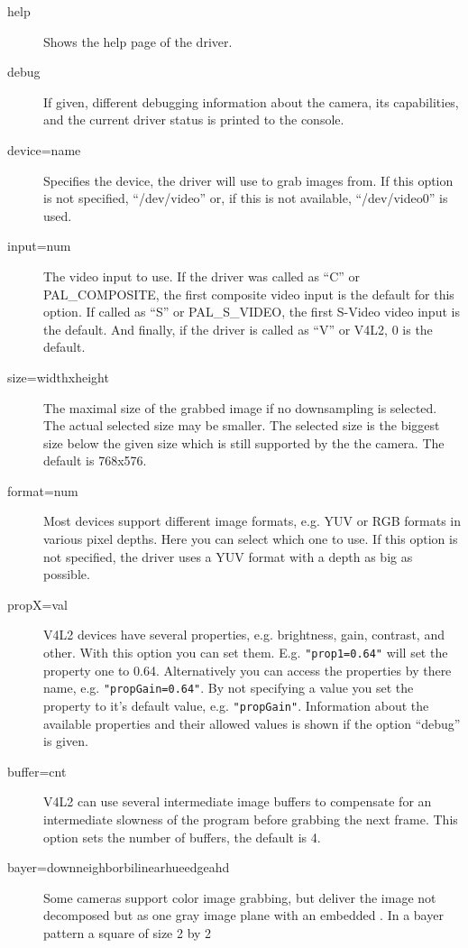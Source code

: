 \begin{description}
\item[help] Shows the help page of the driver.
\item[debug] If given, different debugging information about the
  camera, its capabilities, and the current driver status is
  printed to the console.
\item[device=name] Specifies the device, the driver will use to grab
  images from. If this option is not specified, ``/dev/video'' or,
  if this is not available, ``/dev/video0'' is used.
\item[input=num] The video input to use. If the driver was called as
  ``C'' or PAL\_COMPOSITE, the first composite video input is the
  default for this option. If called as ``S'' or PAL\_S\_VIDEO, the
  first S-Video video input is the default. And finally, if the
  driver is called as ``V'' or V4L2, 0 is the default.
\item[size=widthxheight] The maximal size of the grabbed image if no
  downsampling is selected. The actual selected size may be
  smaller. The selected size is the biggest size below the given
  size which is still supported by the the camera. The default is
  768x576.
\item[format=num] Most devices support different image formats,
  e.g. YUV or RGB formats in various pixel depths. Here you can
  select which one to use. If this option is not specified, the
  driver uses a YUV format with a depth as big as possible.
\item[propX=val] V4L2 devices have several properties,
  e.g. brightness, gain, contrast, and other. With this option you
  can set them. E.g. \verb|"prop1=0.64"| will set the property one
  to 0.64. Alternatively you can access the properties by there
  name, e.g. \verb|"propGain=0.64"|. By not specifying a value you
  set the property to it's default value,
  e.g. \verb|"propGain"|. Information about the available properties
  and their allowed values is shown if the option ``debug'' is
  given.
\item[buffer=cnt] V4L2 can use several intermediate image buffers to
  compensate for an intermediate slowness of the program before
  grabbing the next frame. This option sets the number of buffers,
  the default is 4.
\item[bayer=down\textbar{}neighbor\textbar{}bilinear\textbar{}hue\textbar{}edge\textbar{}ahd]
  Some cameras support color image grabbing, but deliver the image
  not decomposed but as one gray image plane with an embedded
  . In a bayer pattern a square of size 2 by 2

\end{description}
